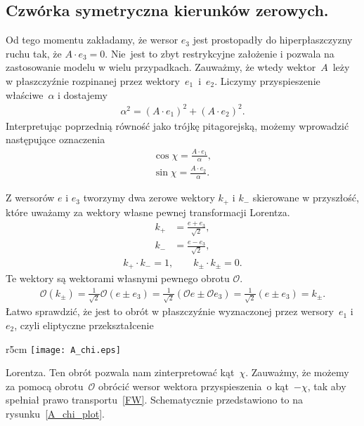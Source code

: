 \subsection{Czwórka symetryczna kierunków zerowych.}
Od tego momentu zakładamy, że wersor $e_3$ jest prostopadły do 
hiperpłaszczyzny ruchu tak, że
$A\cdot e_3 = 0$.
\mbox{Nie jest} to zbyt restrykcyjne założenie i pozwala 
na zastosowanie modelu w wielu przypadkach.
Zauważmy, że wtedy wektor~$A$~leży w płaszczyźnie rozpinanej przez 
wektory~$e_1$~i~$e_2$. Liczymy przyspieszenie właściwe~$\alpha$ i 
dostajemy
\begin{align*}
\alpha^2 = (A\cdot e_1)^2 + (A\cdot e_2)^2.
\end{align*}
Interpretując poprzednią równość jako trójkę pitagorejską,
możemy wprowadzić następujące oznaczenia
\begin{align*}
\cos\chi = \frac{A\cdot e_1}{\alpha},\\
\sin\chi = \frac{A\cdot e_2}{\alpha}.
\end{align*}

Z wersorów $e$ i $e_3$ tworzymy dwa zerowe wektory $k_+$ i $k_-$
skierowane w przyszłość, 
które uważamy za wektory własne pewnej transformacji Lorentza. 
\begin{align*}
k_+ &= \frac{e+e_3}{\sqrt{2}} ,\\
k_- &= \frac{e-e_3}{\sqrt{2}} ,
\end{align*}
\begin{align*}
k_+\cdot k_- = 1, \qquad k_\pm\cdot k_\pm  = 0.
\end{align*}
Te wektory są wektorami własnymi pewnego obrotu $\mathcal{O}$.
\begin{align*}
\mathcal{O}( k_\pm ) = \frac{1}{\sqrt{2}} \mathcal{O} 
(e\pm e_3) =\frac{1}{\sqrt{2}} 
(\mathcal{O} e\pm \mathcal{O} e_3) =
\frac{1}{\sqrt{2}}  (e\pm e_3) = k_\pm.
\end{align*}
 Łatwo sprawdzić, że 
jest 
to obrót w płaszczyźnie wyznaczonej przez wersory~$e_1$ i $e_2$,
czyli eliptyczne przekształcenie \begin{wrapfigure}[15]{r}{5cm}
\centering
\texttt{[image: A\_chi.eps]}
\caption{Schemat obrazujący obrót~$\mathcal{O}$ wykonany na wersorze 
przyspieszenia $A/\alpha$ w bazie $E$.}{\label{A_chi_plot}}
\end{wrapfigure}Lorentza. 
Ten obrót pozwala nam zinterpretować kąt~$\chi$. 
Zauważmy, że możemy za pomocą obrotu~$\mathcal{O}$ obrócić 
wersor wektora przyspieszenia~o kąt~$-\chi$,
tak aby spełniał prawo transportu~\eqref{FW}. 
Schematycznie przedstawiono to na rysunku~\ref{A_chi_plot}.

